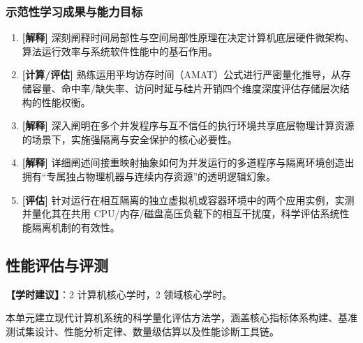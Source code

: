 \subsubsection{示范性学习成果与能力目标}
\begin{enumerate}
    \item \textbf{[解释]} 深刻阐释时间局部性与空间局部性原理在决定计算机底层硬件微架构、算法运行效率与系统软件性能中的基石作用。
    \item \textbf{[计算/评估]} 熟练运用平均访存时间（AMAT）公式进行严密量化推导，从存储容量、命中率/缺失率、访问时延与硅片开销四个维度深度评估存储层次结构的性能权衡。
    \item \textbf{[解释]} 深入阐明在多个并发程序与互不信任的执行环境共享底层物理计算资源的场景下，实施强隔离与安全保护的核心必要性。
    \item \textbf{[解释]} 详细阐述间接重映射抽象如何为并发运行的多道程序与隔离环境创造出拥有“专属独占物理机器与连续内存资源”的透明逻辑幻象。
    \item \textbf{[评估]} 针对运行在相互隔离的独立虚拟机或容器环境中的两个应用实例，实测并量化其在共用 CPU/内存/磁盘高压负载下的相互干扰度，科学评估系统性能隔离机制的有效性。
\end{enumerate}

\subsection{性能评估与评测}
\textbf{【学时建议】}：2 计算机核心学时，2 领域核心学时。

本单元建立现代计算机系统的科学量化评估方法学，涵盖核心指标体系构建、基准测试集设计、性能分析定律、数量级估算以及性能诊断工具链。

